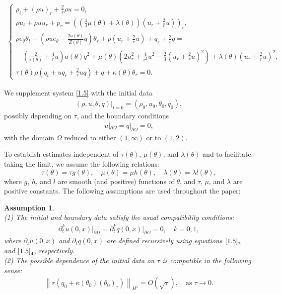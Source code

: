 \documentclass[11pt,reqno]{amsart}
\numberwithin{equation}{section}
\newtheorem{assumption}[theorem]{Assumption}
\begin{document}
\begin{align}\label{1.5}
\begin{cases}
	\rho_t+(\rho u)_r+\frac{2}{r} \rho u = 0, \\
	\rho u_t+\rho u u_r+ p_r =\left( \left(\frac{4}{3} \mu(\theta)+\lambda(\theta)\right)\left(u_{r}+\frac{2}{r}u \right)\right)_r ,\\
	\rho e_\theta \theta_t + (\rho u e_\theta - \frac{2a(\theta)}{Z(\theta)} q)\theta_r + p\left(u_r+\frac{2}{r} u\right) + q_r + \frac{2}{r} q = \\
	\quad  \left(\frac{2}{\tau(\theta)}+\frac{4}{r} u\right) a(\theta) q^2 + \mu(\theta)\left( 2u_r^2+\frac{4}{r^2}u^2 - \frac{2}{3} \left(u_r+\frac{2}{r} u\right)^2\right) + \lambda(\theta)\left(u_r+\frac{2}{r} u\right)^2, \\
	\tau (\theta) \rho \left(q_t+u q_r+\frac{2}{r} u q\right) + q + \kappa(\theta) \theta_r = 0.
\end{cases}
\end{align}

We supplement system \eqref{1.5} with the initial data
\begin{align}\label{initial}
(\rho, u, \theta, q)|_{t=0} = (\rho_0, u_0, \theta_0, q_0),
\end{align}
possibly depending on $\tau$, and the boundary conditions
\begin{align}\label{1.6}
u|_{\partial \Omega} = q|_{\partial \Omega} = 0,
\end{align}
with the domain $\Omega$ reduced to either $(1, \infty)$ or to $(1, 2)$.



To establish estimates independent of $\tau(\theta)$, $\mu(\theta)$, and $\lambda(\theta)$ and to facilitate taking the limit, we assume the following relations:
\[
\tau(\theta) = \tau g(\theta), \quad \mu(\theta) = \mu h(\theta), \quad \lambda(\theta) = \lambda l(\theta),
\]
where $g$, $h$, and $l$ are smooth (and positive) functions of $\theta$, and $\tau$, $\mu$, and $\lambda$ are positive constants. The following assumptions are used throughout the paper:

\begin{assumption}\label{ass}
\mbox{}\\
(1) The initial and boundary data satisfy the usual compatibility conditions:
\begin{align}\label{compatibility condition}
	\partial_t^k u(0,x)\big|_{\partial\Omega} = \partial_t^k q(0,x)\big|_{\partial\Omega} = 0, \quad k = 0, 1,
\end{align}
where $\partial_t u(0,x)$ and $\partial_t q(0,x)$ are defined recursively using equations $\eqref{1.5}_2$ and $\eqref{1.5}_4$, respectively.\\[0.5em]
(2) The possible dependence of the initial data on $\tau$ is compatible in the following sense:
\begin{align}\label{compatibility}
\left\|r\left(q_0 + \kappa(\theta_0)(\theta_0)_r\right)\right\|_{H^1} = O(\sqrt{\tau}), \quad \text{as } \tau \to 0.
\end{align}
\end{assumption}
\end{document}
